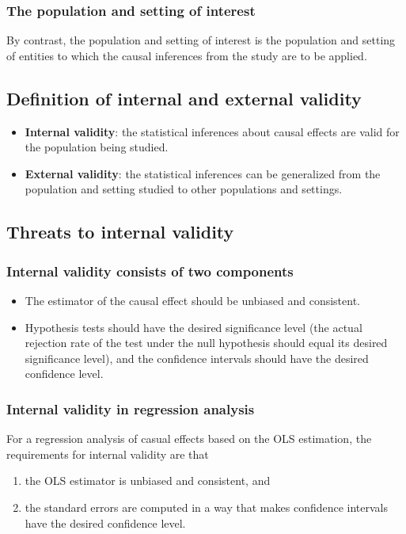 \documentclass[a4paper,11pt]{article}
\begin{document}
\subsubsection*{The population and setting of interest}
\label{sec:org2896b51}
By contrast, the population and setting of interest is the population
and setting of entities to which the causal inferences from the study
are to be applied. 

\subsection{Definition of internal and external validity}
\label{sec:org818b2b6}
\begin{itemize}
\item \textbf{Internal validity}: the statistical inferences about causal
effects are valid for the population being studied.
\item \textbf{External validity}: the statistical inferences can be generalized from
the population and setting studied to other populations and
settings.
\end{itemize}

\subsection{Threats to internal validity}
\label{sec:org62aa4cd}
\subsubsection*{Internal validity consists of two components}
\label{sec:org44bcb35}

\begin{itemize}
\item The estimator of the causal effect should be unbiased and
consistent.
\item Hypothesis tests should have the desired significance level (the
actual rejection rate of the test under the null hypothesis should
equal its desired significance level), and the confidence intervals
should have the desired confidence level.
\end{itemize}
\subsubsection*{Internal validity in regression analysis}
\label{sec:org29249c9}

For a regression analysis of casual effects based on the OLS
estimation, the requirements for internal validity are that 
\begin{enumerate}
\item the OLS estimator is unbiased and consistent, and
\item the standard errors are computed in a way that makes confidence
intervals have the desired confidence level.
\end{enumerate}
\end{document}
